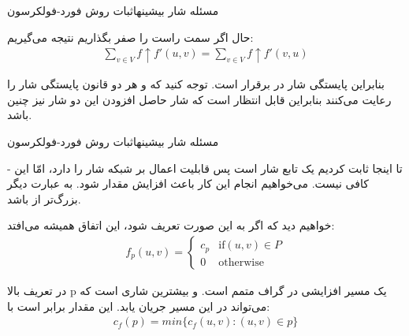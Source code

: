 \begin{itemframe}{مسئله شار بیشینه}{اثبات روش فورد-فولکرسون}
\item
حال اگر سمت راست  را صفر بگذاریم نتیجه می‌گیریم:
\begin{align*}
\sum_{v\in V} f \uparrow f'(u, v)  = \sum_{v\in V} f \uparrow f'(v, u)
\end{align*}

\item
بنابراین پایستگی شار در
برقرار است. توجه کنید که
و
هر دو قانون پایستگی شار را رعایت می‌کنند بنابراین قابل انتظار است که شار حاصل افزودن این دو شار نیز چنین باشد.
\end{itemframe}
\begin{itemframe}{مسئله شار بیشینه}{اثبات روش فورد-فولکرسون}
\item [-]
تا اینجا ثابت کردیم
یک تابع شار است پس قابلیت اعمال بر شبکه شار را دارد، امّا این کافی نیست. می‌خواهیم انجام این کار باعث افزایش مقدار
شود. به عبارت دیگر
بزرگ‌تر از
باشد.
\item
خواهیم دید که اگر
به این صورت تعریف شود، این اتفاق همیشه می‌افتد:
\begin{align}
f_p(u, v)=
\begin{cases}
c_p& \text{if} (u, v) \in P\\
0 &\text{otherwise}
\end{cases}
\label{aug-path}
\end{align}


\item
در تعریف بالا p یک مسیر افزایشی در گراف متمم است. و
بیشترین شاری است که می‌تواند در این مسیر جریان یابد. این مقدار برابر است با:
\begin{align}
c_f(p) = min \{c_f(u, v): (u, v) \in p\}
\label{path-cap}
\end{align}

\end{itemframe}

